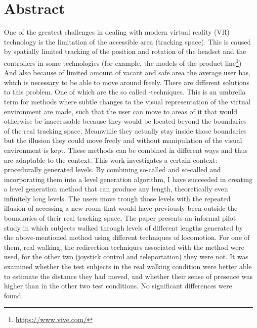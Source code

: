 \chapter*{Abstract}
One of the greatest challenges in dealing with modern virtual reality (VR) technology is the limitation of the accessible area (tracking space).
This is caused by spatially limited tracking of the position and rotation of the headset and the controllers in some technologies (for example, the models of the  product line\footnote{\href{https://www.vive.com/}{https://www.vive.com/}})
And also because of limited amount of vacant and safe area the average user has, which is necessary to be able to move around freely.
There are different solutions to this problem.
One of which are the so called -techniques.
This is an umbrella term for methods where subtle changes to the visual representation of the virtual environment are made, such that the user can move to areas of it that would otherwise be inaccessable because they would be located beyond the boundaries of the real tracking space. Meanwhile they actually stay inside those boundaries but the illusion they could move freely and without manipulation of the visual environment is kept.
These methods can be combined in different ways and thus are adaptable to the context. This work investigates a certain context: procedurally generated levels. By combining so-called  and so-called  and incorporating them into a level generation algorithm, I have succeeded in creating a level generation method that can produce any length, theoretically even infinitely long levels.
The users move trough those levels with the repeated illusion of accessing a new room that would have previously been outside the boundaries of their real tracking space.
The paper presents an informal pilot study in which subjects walked through levels of different lengths generated by the above-mentioned method using different techniques of locomotion. For one of them, real walking, the redirection techniques associated with the method were used, for the other two (joystick control and teleportation) they were not. It was examined whether the test subjects in the real walking condition were better able to estimate the distance they had moved, and whether their sense of presence was higher than in the other two test conditions. No significant differences were found.